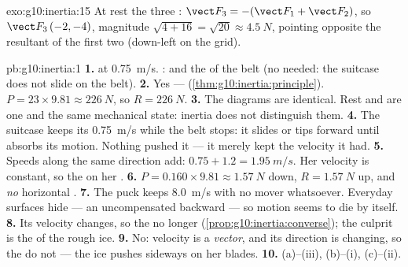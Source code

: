 \begin{solution}{exo:g10:inertia:15}
At rest the three  :
$\vect F_3 = -(\vect F_1 + \vect F_2)$, so $\vect F_3\,(-2, -4)$,
magnitude $\sqrt{4 + 16} = \sqrt{20} \approx \qty{4.5}{N}$, pointing
opposite the resultant of the first two (down-left on the grid).
\end{solution}

\begin{solution}{pb:g10:inertia:1}
\textbf{1.}  at \qty{0.75}{m/s}. : 
and the  of the belt (no  needed: the suitcase
does not slide on the belt).
\textbf{2.} Yes --- 
(\cref{thm:g10:inertia:principle}). $P = 23 \times 9.81 \approx
\qty{226}{N}$, so $R = \qty{226}{N}$.
\textbf{3.} The diagrams are identical. Rest and  are one and the same mechanical state: inertia does not
distinguish them.
\textbf{4.} The suitcase keeps its \qty{0.75}{m/s} while the belt
stops: it slides or tips forward until  absorbs its motion.
Nothing pushed it --- it merely kept the velocity it had.
\textbf{5.} Speeds along the same direction add: $0.75 + 1.2 =
\qty{1.95}{m/s}$. Her velocity is constant, so the  on her
.
\textbf{6.} $P = 0.160 \times 9.81 \approx \qty{1.57}{N}$ down,
$R = \qty{1.57}{N}$ up, and \emph{no} horizontal .
\textbf{7.} The puck keeps \qty{8.0}{m/s} with no mover whatsoever.
Everyday surfaces hide  --- an uncompensated backward  ---
so motion seems to die by itself.
\textbf{8.} Its velocity changes, so the  no longer 
(\cref{prop:g10:inertia:converse}); the culprit is the  of the
rough ice.
\textbf{9.} No: velocity is a \emph{vector}, and its direction is
changing, so the  do not  --- the ice pushes sideways
on her blades.
\textbf{10.} (a)--(iii), (b)--(i), (c)--(ii).

\end{solution}
